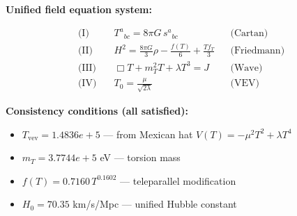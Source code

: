 
\textbf{Unified field equation system:}

\begin{align}
  \text{(I)} \quad & T^a{}_{bc} = 8\pi G \, s^a{}_{bc} && \text{(Cartan)} \\
  \text{(II)} \quad & H^2 = \frac{8\pi G}{3}\rho - \frac{f(T)}{6} + \frac{Tf_T}{3} && \text{(Friedmann)} \\
  \text{(III)} \quad & \Box T + m_T^2 T + \lambda T^3 = J && \text{(Wave)} \\
  \text{(IV)} \quad & T_0 = \frac{\mu}{\sqrt{2\lambda}} && \text{(VEV)}
\end{align}

\textbf{Consistency conditions (all satisfied):}
\begin{itemize}
  \item $T_{\text{vev}} = 1.4836e+5$ — from Mexican hat $V(T) = -\mu^2 T^2 + \lambda T^4$
  \item $m_T = 3.7744e+5$ eV — torsion mass
  \item $f(T) = 0.7160 \, T^{0.1602}$ — teleparallel modification
  \item $H_0 = 70.35$ km/s/Mpc — unified Hubble constant
\end{itemize}